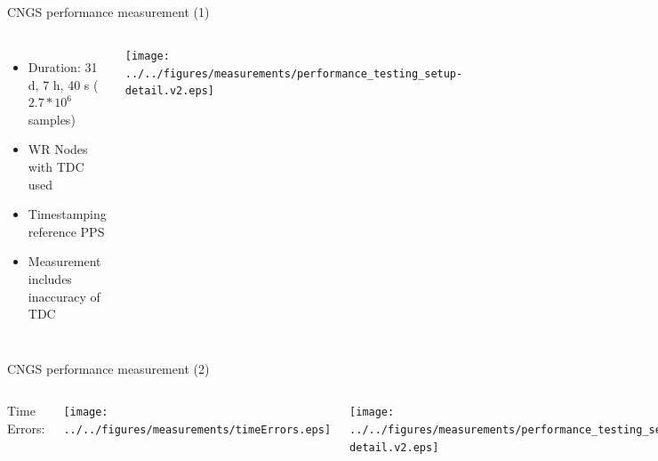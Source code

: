 \documentclass[compress,red]{beamer}
\begin{document}
\subsection{}
\begin{frame}{CNGS performance measurement (1)}

  \begin{columns}[c]
	  \begin{itemize}
		\item Duration: 31 d, 7 h, 40 s ($2.7*10^6$ samples)
		\item WR Nodes with TDC used
		\item Timestamping reference PPS
		\item Measurement includes inaccuracy of TDC
	  \end{itemize}
		\begin{center}
		\texttt{[image: ../../figures/measurements/performance\_testing\_setup-detail.v2.eps]}
		\end{center}
  \end{columns}


\end{frame}
\begin{frame}{CNGS performance measurement (2)}

  \begin{columns}[c]
	  \begin{center}
	  Time Errors:
	  \end{center}
	  \begin{center}
	\texttt{[image: ../../figures/measurements/timeErrors.eps]}
	  \end{center}
		\begin{center}
		\texttt{[image: ../../figures/measurements/performance\_testing\_setup-detail.v2.eps]}
		
		\end{center}
  \end{columns}


\end{frame}
\end{document}
